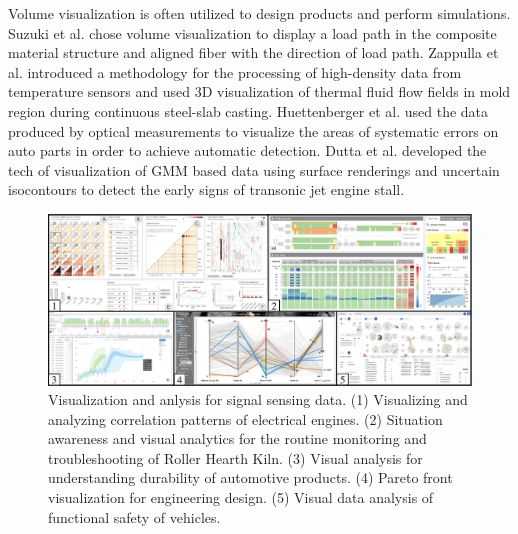 \documentclass[a4paper,fleqn]{cas-dc}
\begin{document}
Volume visualization is often utilized to design products and perform simulations.
Suzuki et al. \cite{Suzuki2020} chose volume visualization to display a load path in the composite material structure and aligned fiber with the direction of load path.
Zappulla et al. \cite{Zappulla2019} introduced a methodology for the processing of high-density data from temperature sensors and used 3D visualization of thermal fluid flow fields in mold region during continuous steel-slab casting.
Huettenberger et al. \cite{Huettenberger2015} used the data produced by optical measurements to visualize the areas of systematic errors on auto parts in order to achieve automatic detection.
Dutta et al. \cite{dutta2016situ} developed the tech of visualization of GMM based data using surface renderings and uncertain isocontours to detect the early signs of transonic jet engine stall.

\begin{figure}[pos=!h]
	\centering
	\includegraphics[width=\textwidth]{Images/signal data.pdf}
	\vspace{-1em}
	\caption{Visualization and anlysis for signal sensing data. (1) Visualizing and analyzing correlation patterns of	electrical engines. (2) Situation awareness and visual analytics for the routine monitoring and troubleshooting of Roller Hearth Kiln. (3) Visual analysis for understanding durability of automotive products. (4) Pareto front visualization for engineering design. (5) Visual data analysis of functional safety of vehicles.}
	\label{fig:signaldata}
	\vspace{-1.5em}
\end{figure}
\end{document}
